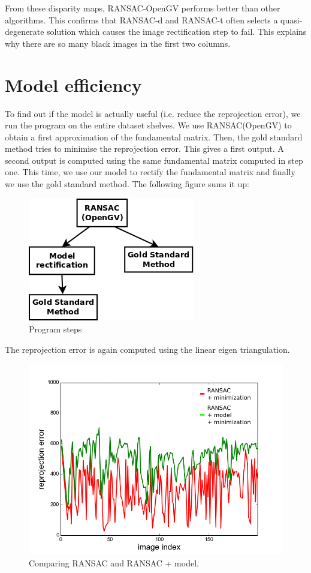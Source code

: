 \documentclass[11pt]{report}
\begin{document}
From these disparity maps, RANSAC-OpenGV performs better than other algorithms. This confirms that RANSAC-d and RANSAC-t often selects a quasi-degenerate solution which causes the image rectification step to fail. This explains why there are so many black images in the first two columns.

\section{Model efficiency}

To find out if the model is actually useful (i.e. reduce the reprojection error), we run the program on the entire dataset shelves. We use RANSAC(OpenGV) to obtain a first approximation of the fundamental matrix. Then, the gold standard method tries to minimise the reprojection error. This gives a first output. A second output is computed using the same fundamental matrix computed in step one. This time, we use our model to rectify the fundamental matrix and finally we use the gold standard method. The following figure sums it up:
\begin{figure}[H]
  \centering
  \includegraphics[scale=0.45]{images/model-program.png}
  \caption{Program steps}
\end{figure}

The reprojection error is again computed using the linear eigen triangulation.

\begin{figure}[H]
  \centering
  \includegraphics[scale=0.5]{images/error-model-ransac.png}
  \caption{Comparing RANSAC and RANSAC + model.}
\end{figure}
\end{document}

